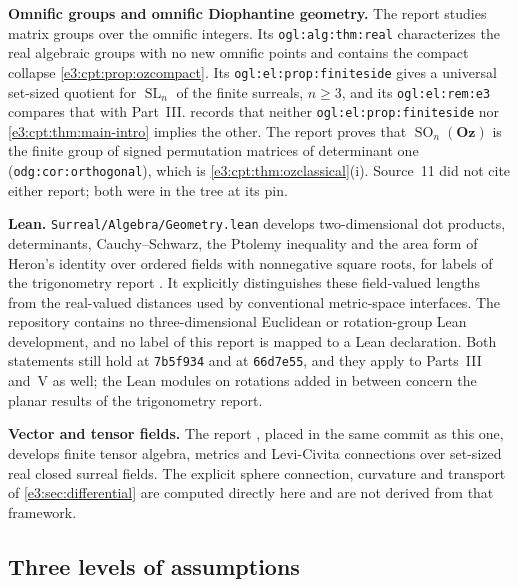 \documentclass[11pt,letterpaper]{article}
\numberwithin{equation}{section}
\theoremstyle{definition}
\theoremstyle{remark}
\newcommand{\Oz}{\mathbf{Oz}}
\newcommand{\SO}{\operatorname{SO}}
\newcommand{\SL}{\operatorname{SL}}
\begin{document}
\textbf{Omnific groups and omnific Diophantine geometry.} The report
 \cite{RepoOGL} studies matrix
groups over the omnific integers. Its \texttt{ogl:alg:thm:real} characterizes the
real algebraic groups with no new omnific points and contains the compact
collapse \cref{e3:cpt:prop:ozcompact}. Its \texttt{ogl:el:prop:finiteside} gives
a universal set-sized quotient for $\SL_n$ of the finite surreals, $n\ge3$, and
its \texttt{ogl:el:rem:e3} compares that with Part~III.
 records that neither \texttt{ogl:el:prop:finiteside} nor
\cref{e3:cpt:thm:main-intro} implies the other. The report
 \cite{RepoODG} proves that
$\SO_n(\Oz)$ is the finite group of signed permutation matrices of determinant
one (\texttt{odg:cor:orthogonal}), which is \cref{e3:cpt:thm:ozclassical}(i).
Source~11 did not cite either report; both were in the tree at its pin.

\textbf{Lean.} \texttt{Surreal/Algebra/Geometry.lean} develops
two-dimensional dot products, determinants, Cauchy--Schwarz, the Ptolemy
inequality and the area form of Heron's identity over ordered fields with
nonnegative square roots, for labels of the trigonometry report
\cite{RepoGeometry}. It explicitly distinguishes these field-valued lengths from
the real-valued distances used by conventional metric-space interfaces. The repository contains no three-dimensional Euclidean or
rotation-group Lean development, and no label of this report is mapped to a
Lean declaration. Both statements still hold at \texttt{7b5f934} and at
\texttt{66d7e55}, and they apply to Parts~III and~V as well; the Lean modules on
rotations added in between concern the planar results of the trigonometry
report.

\textbf{Vector and tensor fields.} The report
, placed in the same commit as
this one, develops finite tensor algebra, metrics and Levi-Civita connections
over set-sized real closed surreal fields. The explicit sphere connection,
curvature and transport of \cref{e3:sec:differential} are computed directly
here and are not derived from that framework.

\subsection{Three levels of assumptions}\label{e3:sub:levels}
\end{document}
